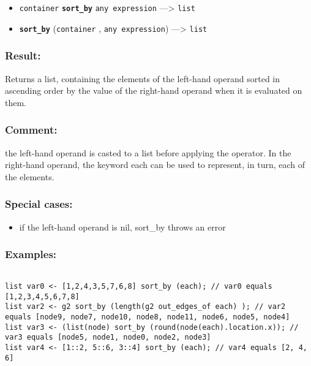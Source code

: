 \documentclass[]{book}
\providecommand{\tightlist}{%
  \setlength{\itemsep}{0pt}\setlength{\parskip}{0pt}}
\theoremstyle{definition}
\theoremstyle{definition}
\theoremstyle{definition}
\theoremstyle{remark}
\begin{document}
\begin{itemize}
\tightlist
\item
  \texttt{container} \textbf{\texttt{sort\_by}} \texttt{any\ expression}
  ---\textgreater{} \texttt{list}
\item
  \textbf{\texttt{sort\_by}} (\texttt{container} ,
  \texttt{any\ expression}) ---\textgreater{} \texttt{list}
\end{itemize}

\subsubsection{Result:}\label{result-470}

Returns a list, containing the elements of the left-hand operand sorted
in ascending order by the value of the right-hand operand when it is
evaluated on them.

\subsubsection{Comment:}\label{comment-89}

the left-hand operand is casted to a list before applying the operator.
In the right-hand operand, the keyword each can be used to represent, in
turn, each of the elements.

\subsubsection{Special cases:}\label{special-cases-124}

\begin{itemize}
\tightlist
\item
  if the left-hand operand is nil, sort\_by throws an error
\end{itemize}

\subsubsection{Examples:}\label{examples-339}

\begin{verbatim}
 
list var0 <- [1,2,4,3,5,7,6,8] sort_by (each); // var0 equals [1,2,3,4,5,6,7,8] 
list var2 <- g2 sort_by (length(g2 out_edges_of each) ); // var2 equals [node9, node7, node10, node8, node11, node6, node5, node4] 
list var3 <- (list(node) sort_by (round(node(each).location.x)); // var3 equals [node5, node1, node0, node2, node3] 
list var4 <- [1::2, 5::6, 3::4] sort_by (each); // var4 equals [2, 4, 6]
\end{verbatim}
\end{document}

